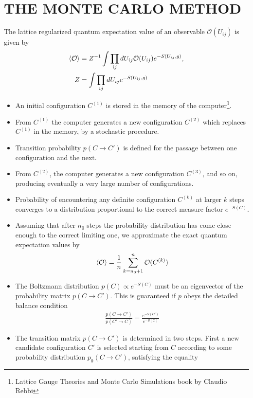 \documentclass{article}
\begin{document}
\section{THE MONTE CARLO METHOD} 
The lattice regularized quantum expectation value of an observable $\mathcal{O}(U_{ij})$ is given by
\begin{align}
    \braket{\mathcal{O}}&=Z^{-1}\int \prod_{ij}dU_{ij}\mathcal{O}(U_{ij})e^{-S(U_{ij},g)},\\
    Z&=\int \prod_{ij}dU_{ij}e^{-S(U_{ij},g)}
\end{align}
\begin{itemize}
    \item  An initial configuration $C^{(1)}$ is stored in the memory of the computer\footnote{Lattice Gauge Theories and Monte Carlo Simulations book by Claudio Rebbi }.        
    \item From $C^{(1)}$ the computer generates a new configuration $C^{(2)}$ which replaces $C^{(1)}$ in the memory, by a stochastic procedure.
    \item Transition probability $p(C\longrightarrow C')$ is defined for the passage between one configuration and the next. 
    \item From $C^{(2)}$, the computer generates a new configuration $C^{(3)}$, and so on, producing eventually a very large number of configurations. 
    \item Probability of encountering any definite configuration $C^(k)$ at larger $k$ steps converges to a distribution proportional to the correct measure factor $e^{-S(C)}$.
    \item Assuming that after $n_0$ steps the probability distribution has come close enough to the correct limiting one, we approximate the exact quantum expectation values by
    \begin{align}
        \braket{\mathcal{O}}=\frac{1}{n}\sum_{k=n_0+1}^{n}\mathcal{O}(C^{(k)})
    \end{align}
    \item The Boltzmann distribution $p(C) \propto e^{-S(C)}$ must be an eigenvector of the probability matrix $p(C \longrightarrow C')$. This is guaranteed if $p$ obeys the detailed balance condition 
    \begin{align}
        \frac{p(C\longrightarrow C')}{p(C'\longrightarrow C)}=\frac{e^{-S(C')}}{e^{-S(C)}}
    \end{align}
    \item The transition matrix $p(C \longrightarrow C')$ is determined in two steps. First a new candidate configuration $C'$ is selected starting from $C$ according to some probability distribution $p_0(C\longrightarrow C')$, satisfying the equality 

\end{itemize}
\end{document}
